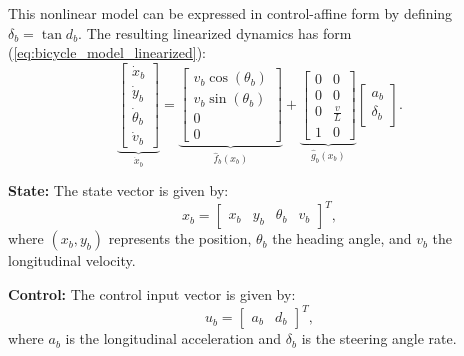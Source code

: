 \documentclass{svproc}
\begin{document}
        This nonlinear model can be expressed in control-affine form by defining
        $\delta_{b} = \tan{d_{b}}$. The resulting linearized dynamics has form
        (\ref{eq:bicycle_model_linearized}):
        \begin{equation}
            \label{eq:bicycle_model_linearized}
            \underbrace{
            \begin{bmatrix}
                \dot{x}_{b}\\
                \dot{y}_{b}\\
                \dot{\theta}_{b}\\
                \dot{v}_{b}
            \end{bmatrix}
            }_{\dot{x}_{b}}
            =
            \underbrace{
            \begin{bmatrix}
                v_{b}\cos{(\theta_{b})}\\
                v_{b}\sin{(\theta_{b})}\\
                0\\
                0
            \end{bmatrix}
            }_{\hat{f}_{b}(x_{b})}
            +
            \underbrace{
            \begin{bmatrix}
                0 & 0\\
                0 & 0\\
                0 & \frac{v}{L}\\
                1 & 0
            \end{bmatrix}
            }_{\hat{g}_{b}(x_{b})}
            \begin{bmatrix}
                a_{b}\\
                \delta_{b}
            \end{bmatrix}.
        \end{equation}

        \textbf{State:}
        The state vector is given by:
        \[
            x_{b} =
            \begin{bmatrix}
                x_{b} & y_{b} & \theta_{b} & v_{b}
            \end{bmatrix}^{T},
        \]
        where $(x_{b}, y_{b})$ represents the position, $\theta_{b}$ the heading
        angle, and $v_{b}$ the longitudinal velocity.

        \textbf{Control:}
        The control input vector is given by:
        \[
            u_{b} =
            \begin{bmatrix}
                a_{b} & d_{b}
            \end{bmatrix}^{T},
        \]
        where $a_{b}$ is the longitudinal acceleration and $\delta_{b}$ is the
        steering angle rate.
\end{document}
